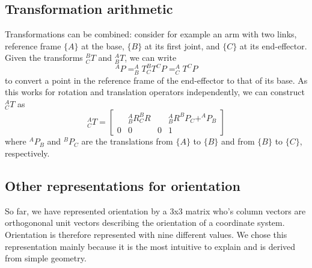 \subsection{Transformation arithmetic}
Transformations can be combined: consider for example an arm with two links, reference frame $\{A\}$ at the base, $ \{B\} $ at its first joint, and $\{C\}$ at its end-effector. Given the transforms $ ^B_CT$ and $ ^A_BT$, we can write
\begin{equation}
^AP=^A_BT^B_CT^CP=^A_CT^CP
\end{equation}
to convert a point in the reference frame of the end-effector to that of its base. As this works for rotation and translation operators independently, we can construct $ ^A_CT$ as
\begin{equation}
^A_CT=\left[\begin{array}{ccc|c} & ^A_BR^B_CR & & ^A_BR^BP_C +^AP_B \\\hline 0 & 0 & 0 & 1\end{array}\right]
\end{equation}
%
where $ ^AP_B$ and $ ^BP_C$ are the translations from $\{A\}$ to $\{B\}$ and from $ \{B\}$ to $\{C\}$, respectively.

\subsection{Other representations for orientation}
So far, we have represented orientation by a 3x3 matrix who's column vectors are orthogononal unit vectors describing the orientation of a coordinate system. Orientation is therefore represented with nine different values. We chose this representation mainly because it is the most intuitive to explain and is derived from simple geometry.

